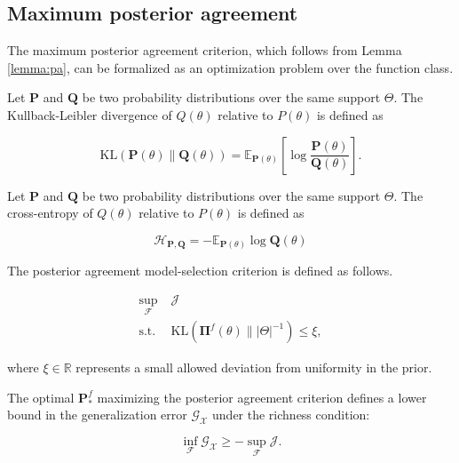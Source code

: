 \subsection{Maximum posterior agreement}

The maximum posterior agreement criterion, which follows 
from Lemma \ref{lemma:pa}, can be formalized as an optimization problem over the 
function class.

\begin{definition}
    Let $\mathbf{P}$ and $\mathbf{Q}$ be two probability distributions over the same support $\Theta$. 
    The Kullback-Leibler divergence of $Q(\theta)$ relative to $P(\theta)$ is defined as

    $$
    \text{KL}(\mathbf{P}(\theta) \parallel \mathbf{Q}(\theta)) = \mathbb{E}_{\mathbf{P}(\theta)} \left[ \log \frac{\mathbf{P}(\theta)}{\mathbf{Q}(\theta)} \right].
    $$

\end{definition} 

\begin{definition}
    Let $\mathbf{P}$ and $\mathbf{Q}$ be two probability distributions over the same support $\Theta$. 
    The cross-entropy of $Q(\theta)$ relative to $P(\theta)$ is defined as

    $$
    \mathcal{H}_{\mathbf{P}, \mathbf{Q}} = - \mathbb{E}_{\mathbf{P}(\theta)} \log \mathbf{Q}(\theta)
    $$

\end{definition}

\begin{definition}\label{def:pa}
    The posterior agreement model-selection criterion is defined as follows.

    $$
    \begin{aligned}
        \sup_{\mathcal{F}} & \; \mathcal{J} \\
        \text{s.t.} & \; \text{KL}(\mathbf{\Pi}^f(\theta) \parallel |\Theta|^{-1}) \leq \xi,
    \end{aligned}
    $$
    
    where $\xi \in \mathbb{R}$ represents a small allowed deviation from uniformity in the prior.
\end{definition}

\begin{theorem}
The optimal $\mathbf{P}_{*}^f$ maximizing the posterior agreement criterion defines a lower bound
in the generalization error $\mathcal{G}_{\mathcal{X}}$ under the richness condition:

$$
    \inf_{\mathcal{F}} \mathcal{G}_{\mathcal{X}} \geq -\sup_{\mathcal{F}} \mathcal{J}.
$$
\end{theorem}

